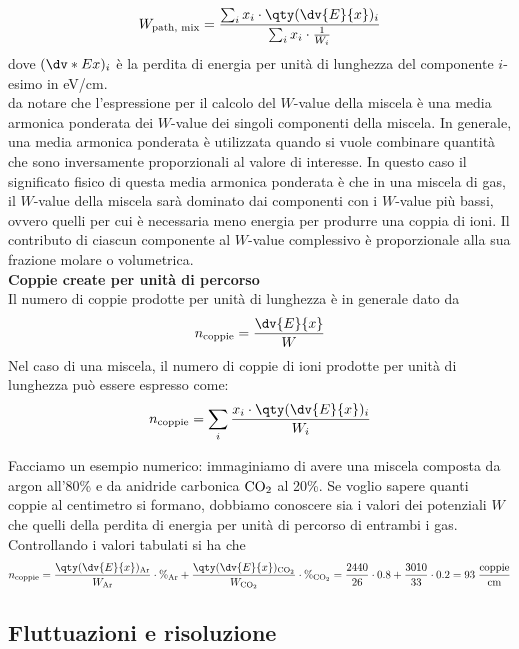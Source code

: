 \begin{approfondimento}
   \begin{equation*}
      W_{\text{path, mix}}
      =\frac{\sum_i x_i \cdot \qty( \dv{E}{x} )_i}{\sum_i x_i \cdot \frac{1}{W_i}}
   \end{equation*}
   dove $(\dv*{E}{x})_i$ è la perdita di energia per unità di lunghezza del componente $i$-esimo in eV/cm.\\
   \E da notare che l'espressione per il calcolo del $W$-value della miscela è una media armonica ponderata dei $W$-value dei singoli componenti della miscela. In generale, una media armonica ponderata è utilizzata quando si vuole combinare quantità che sono inversamente proporzionali al valore di interesse. In questo caso il significato fisico di questa media armonica ponderata è che in una miscela di gas, il $W$-value della miscela sarà dominato dai componenti con i $W$-value più bassi, ovvero quelli per cui è necessaria meno energia per produrre una coppia di ioni. Il contributo di ciascun componente al $W$-value complessivo è proporzionale alla sua frazione molare o volumetrica.\\[0.2cm]
   \textbf{Coppie create per unità di percorso}\\
   Il numero di coppie prodotte per unità di lunghezza è in generale dato da
   \begin{equation*}
      n_{\rm coppie}=\frac{\dv{E}{x}}{W}
   \end{equation*}
   Nel caso di una miscela, il numero di coppie di ioni prodotte per unità di lunghezza può essere espresso come:
   \begin{equation*}
      n_{\rm coppie}
      =\sum_i \frac{x_i \cdot \qty( \dv{E}{x} )_i}{W_i}
   \end{equation*}
\end{approfondimento}

Facciamo un esempio numerico: immaginiamo di avere una miscela composta da argon all'80\% e da anidride carbonica $\rm CO_2$ al 20\%. Se voglio sapere quanti coppie al centimetro si formano, dobbiamo conoscere sia i valori dei potenziali $W$ che quelli della perdita di energia per unità di percorso di entrambi i gas. Controllando i valori tabulati si ha che
\begin{equation*}
   n_{\rm coppie}
   =\frac{\qty(\dv{E}{x})_{\rm Ar}}{W_{\rm Ar}} \cdot \%_{\rm Ar} + \frac{\qty(\dv{E}{x})_{\rm CO_2}}{W_{\rm CO_2}} \cdot \%_{\rm CO_2}
   =\frac{2440}{26} \cdot 0.8 + \frac{3010}{33} \cdot 0.2
   =93 \; \rm \frac{coppie}{cm}
\end{equation*}
\subsection{Fluttuazioni e risoluzione}

